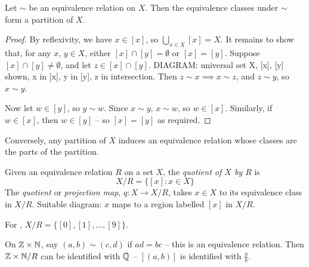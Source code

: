 \documentclass{../template/note}
\begin{document}
    \begin{theorem}
        Let \(\sim\) be an equivalence relation on \(X\). Then the equivalence classes under \(\sim\) form a partition of \(X\).
    \end{theorem}
    
    \begin{proof}
        By reflexivity, we have \(x \in [x]\), so \(\bigcup_{x \in X} [x] = X\). It remains to show that, for any \(x\), \(y \in X\), either \([x] \cap [y] = \emptyset\) or \([x] = [y]\). Suppose \([x] \cap [y] \neq \emptyset\), and let \(z \in [x] \cap [y]\). DIAGRAM: universal set X, [x], [y] shown, x in [x], y in [y], z in intersection. Then \(z \sim x \implies x \sim z\), and \(z \sim y\), so \(x \sim y\).

        Now let \(w \in [y]\), so \(y \sim w\). Since \(x \sim y\), \(x \sim w\), so \(w \in [x]\). Similarly, if \(w \in [x]\), then \(w \in [y]\) -- so \([x] = [y]\) as required.

    \end{proof}
    
    \begin{remark*}
        Conversely, any partition of \(X\) induces an equivalence relation whose classes are the parts of the partition.
    \end{remark*}
    
    \begin{definition}
        Given an equivalence relation \(R\) on a set \(X\), the \emph{quotient of \(X\) by \(R\)} is
        \[
            X/R = \{[x]: x \in X\}
        \]
        The \emph{quotient} or \emph{projection map}, \(q: X \to X/R\), takes \(x \in X\) to its equivalence class in \(X/R\).
        Suitable diagram: \(x\) maps to a region labelled \([x]\) in \(X/R\).
    \end{definition}
    
    \begin{example}
        For , \(X/R = \{[0], [1], \dots, [9]\}\).
    \end{example}
    
    \begin{example}
        On \(\mathbb Z \times \mathbb N\), say \((a, b) \sim (c, d)\) if \(ad = bc\) -- this is an equivalence relation. Then \(\mathbb Z \times \mathbb N / R\) can be identified with \(\mathbb Q\) -- \([(a, b)]\) is identified with \(\frac{a}{b}\).
    \end{example}
    
\end{document}
